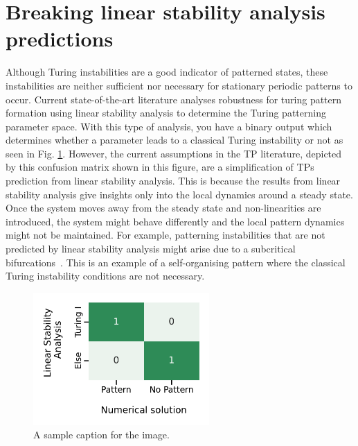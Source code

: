 \section{Breaking linear stability analysis predictions}
Although Turing instabilities are a good indicator of patterned states, these instabilities are neither sufficient nor necessary for stationary periodic patterns to occur.
Current state-of-the-art literature analyses robustness for turing pattern formation using linear stability analysis to determine the Turing patterning parameter space.
With this type of analysis, you have a binary output which determines whether a parameter leads to a classical Turing instability or not as seen in Fig. \ref{fig:lsa_numerical_confusion_literature}.
However, the current assumptions in the TP literature, depicted by this confusion matrix shown in this figure, are a simplification of TPs prediction from linear stability analysis.
This is because the results from linear stability analysis give insights only into the local dynamics around a steady state.
Once the system moves away from the steady state and non-linearities are introduced, the system might behave differently and the local pattern dynamics might not be maintained.
For example, patterning instabilities that are not predicted by linear stability analysis might arise due to a subcritical bifurcations~\parencite{villar, champneys}.
This is an example of a self-organising pattern where the classical Turing instability conditions are not necessary.


\begin{figure}[H] %
    \centering
    \includegraphics[width=0.6\textwidth]{chapters/Chapter 1/lsa_vs_numerical_confusion_literature} %
    \caption{A sample caption for the image.}
    \label{fig:lsa_numerical_confusion_literature} %
\end{figure}


